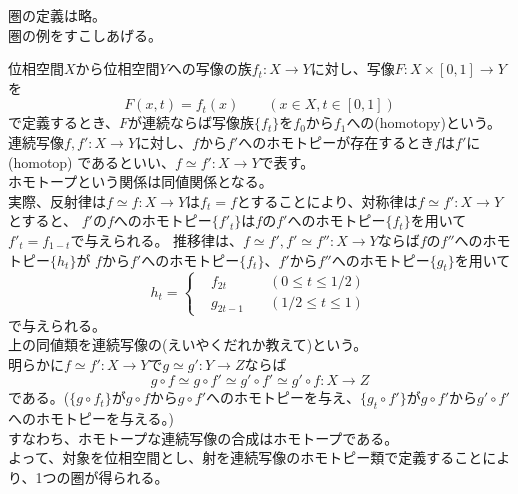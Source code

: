 \documentclass[dvipdfmx,a4paper,11pt]{jsarticle}
\begin{document}
圏の定義は略。\\
圏の例をすこしあげる。
\begin{tcolorbox}[title = 例1]
  位相空間$X$から位相空間$Y$への写像の族$f_{t}:X\to Y$に対し、写像$F:X\times [0,1] \to Y$を
  \begin{equation*}
    F(x,t)=f_{t}(x)\qquad (x\in X,t \in [0,1])
  \end{equation*}
  で定義するとき、$F$が連続ならば写像族$\{f_t\}$を$f_0$から$f_1$への(homotopy)という。\\
  連続写像$f,f':X\to Y$に対し、$f$から$f'$へのホモトピーが存在するとき$f$は$f'$に(homotop)
  であるといい、$f\simeq f':X\to Y$で表す。\\
  ホモトープという関係は同値関係となる。\\
  実際、反射律は$f\simeq f:X\to Y$は$f_{t}=f$とすることにより、対称律は$f\simeq f':X\to Y$とすると、
  $f'$の$f$へのホモトピー$\{f'_{t}\}$は$f$の$f'$へのホモトピー$\{f_{t}\}$を用いて$f'_{t}=f_{1-t}$で与えられる。
  推移律は、$f\simeq f',f'\simeq f'':X\to Y$ならば$f$の$f''$へのホモトピー$\{h_{t}\}$が
  $f$から$f'$へのホモトピー$\{f_{t}\}$、$f'$から$f''$へのホモトピー$\{g_{t}\}$を用いて
  \begin{equation*}
    h_{t}=\left\{ 
    \begin{alignedat}{2}   
      &f_{2t}  \quad &(0\leq t\leq 1/2)\\   
      &g_{2t-1}\quad &(1/2\leq t\leq 1)
    \end{alignedat} 
    \right.
  \end{equation*}
  で与えられる。\\
  上の同値類を連続写像の(えいやくだれか教えて)という。\\
  明らかに$f\simeq f':X\to Y$で$g\simeq g':Y\to Z$ならば\\
  \begin{equation*}
    g\circ f\simeq g\circ f'\simeq g'\circ f'\simeq g'\circ f:X \to Z
  \end{equation*}
  である。($\{g\circ f_{t}\}$が$g\circ f$から$g\circ f'$へのホモトピーを与え、$\{g_{t}\circ f'\}$が$g\circ f'$から$g'\circ f'$へのホモトピーを与える。)\\
  すなわち、ホモトープな連続写像の合成はホモトープである。\\
  よって、対象を位相空間とし、射を連続写像のホモトピー類で定義することにより、1つの圏が得られる。
\end{tcolorbox}

\clearpage
\end{document}
